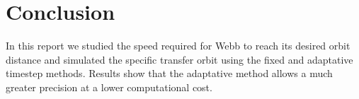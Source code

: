 \section{Conclusion}

In this report we studied the speed required for Webb to reach its desired orbit distance and simulated the specific transfer orbit using the fixed and adaptative timestep methods. Results show that the adaptative method allows a much greater precision at a lower computational cost. 
